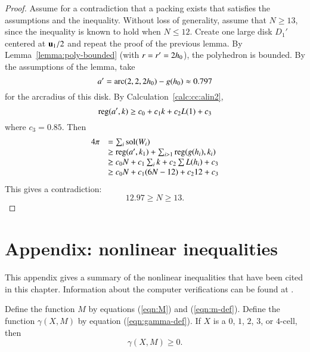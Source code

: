 \begin{proof}  Assume for a contradiction that a packing exists that satisfies the assumptions and the inequality.  Without loss of generality, assume that $N\ge 13$, since the inequality is known to hold when $N\le 12$.   Create one large disk $D_1'$ centered at $ {\mathbf u}_1/2$ and repeat the proof of the previous lemma.  By Lemma~\ref{lemma:poly-bounded} (with $r=r'=2{h_0}$), the polyhedron is bounded.  By the assumptions of the lemma, take 
\begin{displaymath}a'=\operatorname{arc}(2,2,2{h_0})-g({h_0}) \approx 0.797\end{displaymath}
for the arcradius of this disk.  By Calculation~\ref{calc:cc:alin2}, %
\begin{displaymath}{\operatorname{reg}}(a',k) \ge c_0 + c_1 k + c_2 L(1) + c_3\end{displaymath}
where $c_3 = 0.85$.
Then 
\begin{displaymath}
\begin{array}{lll}
4\pi &= \sum_i{\operatorname{sol}}(W_i)\\
     &\ge {\operatorname{reg}}(a',k_1)+\sum_{i>1} {\operatorname{reg}}(g(h_i),k_i) \\
     &\ge  c_0 N +c_1\sum_i k + c_2 \sum L(h_i) + c_3\\
     &\ge c_0 N +c_1 (6N-12) + c_2 12 + c_3\\
\end{array}
\end{displaymath}
This gives a contradiction:
\begin{displaymath}
12.97 \ge N \ge 13.
\end{displaymath}
\end{proof}

\section{Appendix: nonlinear inequalities}

This appendix gives a summary of the nonlinear inequalities that have been cited in this chapter.  Information about the computer verifications can be found at \cite{hales:2009:nonlinear}.

\begin{calculation}\label{calc:marchal}  
Define the function $M$ by equations (\ref{eqn:M}) and (\ref{eqn:m-def}).  Define the function $\gamma(X,M)$ by equation (\ref{eqn:gamma-def}).  If $X$ is a $0$, $1$, $2$, $3$, or $4$-cell, then
\begin{displaymath}
\gamma(X,M)\ge 0.
\end{displaymath}
\end{calculation}

